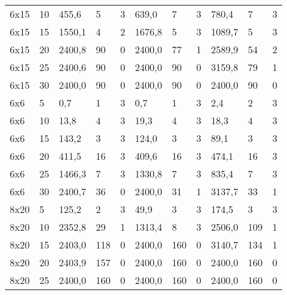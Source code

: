 \begin{table}[]
\begin{tabular}{@{}lllllllllll@{}}
		6x15    & 10            & 455,6     & 5         & 3      & 639,0     & 7         & 3      & 780,4     & 7         & 3      \\
		6x15    & 15            & 1550,1    & 4         & 2      & 1676,8    & 5         & 3      & 1089,7    & 5         & 3      \\
		6x15    & 20            & 2400,8    & 90        & 0      & 2400,0    & 77        & 1      & 2589,9    & 54        & 2      \\
		6x15    & 25            & 2400,6    & 90        & 0      & 2400,0    & 90        & 0      & 3159,8    & 79        & 1      \\
		6x15    & 30            & 2400,0    & 90        & 0      & 2400,0    & 90        & 0      & 2400,0    & 90        & 0      \\
		6x6     & 5             & 0,7       & 1         & 3      & 0,7       & 1         & 3      & 2,4       & 2         & 3      \\
		6x6     & 10            & 13,8      & 4         & 3      & 19,3      & 4         & 3      & 18,3      & 4         & 3      \\
		6x6     & 15            & 143,2     & 3         & 3      & 124,0     & 3         & 3      & 89,1      & 3         & 3      \\
		6x6     & 20            & 411,5     & 16        & 3      & 409,6     & 16        & 3      & 474,1     & 16        & 3      \\
		6x6     & 25            & 1466,3    & 7         & 3      & 1330,8    & 7         & 3      & 835,4     & 7         & 3      \\
		6x6     & 30            & 2400,7    & 36        & 0      & 2400,0    & 31        & 1      & 3137,7    & 33        & 1      \\
		8x20    & 5             & 125,2     & 2         & 3      & 49,9      & 3         & 3      & 174,5     & 3         & 3      \\
		8x20    & 10            & 2352,8    & 29        & 1      & 1313,4    & 8         & 3      & 2506,0    & 109       & 1      \\
		8x20    & 15            & 2403,0    & 118       & 0      & 2400,0    & 160       & 0      & 3140,7    & 134       & 1      \\
		8x20    & 20            & 2403,9    & 157       & 0      & 2400,0    & 160       & 0      & 2400,0    & 160       & 0      \\
		8x20    & 25            & 2400,0    & 160       & 0      & 2400,0    & 160       & 0      & 2400,0    & 160       & 0      \\

\end{tabular}
\end{table}
